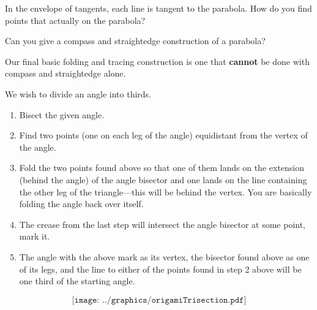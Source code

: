 \begin{question}
In the envelope of tangents, each line is tangent to the parabola.  How do you find points that 
actually on the parabola?  
\end{question}
\QM

\begin{question} Can you give a compass and straightedge construction of a parabola?
\end{question}
\QM

Our final basic folding and tracing construction is one that \textbf{cannot} be
done with compass and straightedge alone.



\begin{construction}
We wish to divide an angle into thirds.
\begin{enumerate}
\item Bisect the given angle.
\item Find two points (one on each leg of the angle) equidistant from the vertex of the angle.
\item Fold the two points found above so that one of them lands on the
  extension (behind the angle) of the angle bisector and one lands on
  the line containing the other leg of the triangle---this will be
  behind the vertex. You are basically folding the angle back over
  itself.
\item The crease from the last step will intersect the angle bisector
  at some point, mark it.
\item The angle with the above mark as its vertex, the bisector found
  above as one of its legs, and the line to either of the points found
  in step 2 above will be one third of the starting angle.
\end{enumerate}
\[
\texttt{[image: ../graphics/origamiTrisection.pdf]}
\]
\end{construction}



